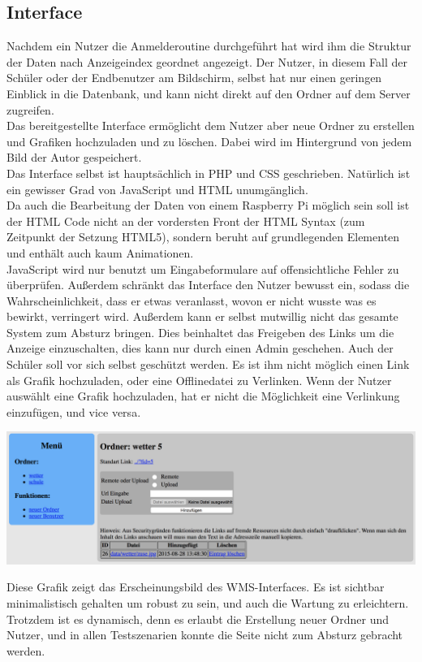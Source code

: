 \subsection{Interface} %
Nachdem ein Nutzer die Anmelderoutine durchgeführt hat wird ihm die Struktur der Daten nach Anzeigeindex geordnet angezeigt.
Der Nutzer, in diesem Fall der Schüler oder der Endbenutzer am Bildschirm,
selbst hat nur einen geringen Einblick in die Datenbank, und kann nicht direkt auf den Ordner auf dem Server zugreifen.\\
Das bereitgestellte Interface ermöglicht dem Nutzer aber neue Ordner
zu erstellen und Grafiken hochzuladen und zu löschen.
Dabei wird im Hintergrund von jedem Bild der Autor gespeichert. \\
Das Interface selbst ist hauptsächlich in PHP und CSS geschrieben.
Natürlich ist ein gewisser Grad von JavaScript und HTML unumgänglich. \\
Da auch die Bearbeitung der Daten von einem Raspberry Pi möglich sein soll ist der HTML Code nicht an der vordersten Front der HTML Syntax (zum Zeitpunkt der Setzung HTML5),
sondern beruht auf grundlegenden Elementen und enthält auch kaum Animationen. \\
JavaScript wird nur benutzt um Eingabeformulare auf offensichtliche Fehler zu überprüfen.
Außerdem schränkt das Interface den Nutzer bewusst ein,
sodass die Wahrscheinlichkeit,
dass er etwas veranlasst, wovon er nicht wusste was es bewirkt, verringert wird.
Außerdem kann er selbst mutwillig nicht das gesamte System zum Absturz bringen.
Dies beinhaltet das Freigeben des Links um die Anzeige einzuschalten,
dies kann nur durch einen Admin geschehen.
Auch der Schüler soll vor sich selbst geschützt werden.
Es ist ihm nicht möglich einen Link als Grafik hochzuladen,
oder eine Offlinedatei zu Verlinken.
Wenn der Nutzer auswählt eine Grafik hochzuladen,
hat er nicht die Möglichkeit eine Verlinkung einzufügen, und vice versa.
\begin{center}
    \includegraphics[width=\linewidth]{imgs/wms/wms_interface.png}
\end{center}
Diese Grafik zeigt das Erscheinungsbild des WMS-Interfaces. Es ist sichtbar
minimalistisch gehalten um robust zu sein, und auch die Wartung zu erleichtern.
Trotzdem ist es dynamisch, denn es erlaubt die Erstellung neuer Ordner und Nutzer,
und in allen Testszenarien konnte die Seite nicht zum Absturz gebracht werden.

